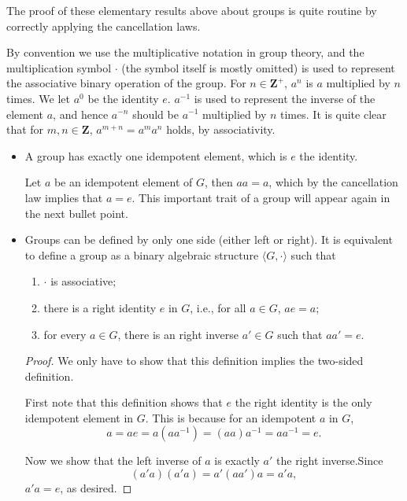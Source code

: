 \documentclass[11pt]{article}
\newcommand{\Z}{\mathbf{Z}}
\newcommand{\la}{\langle}
\newcommand{\ra}{\rangle}
\begin{document}
The proof of these elementary results above about groups is quite routine by correctly applying the cancellation laws.
\begin{framed}
    By convention we use the multiplicative notation in group theory, and the multiplication symbol $\cdot$ (the symbol itself is mostly omitted) is used to represent the associative binary operation of the group. For $n \in \Z^+$, $a^n$ is $a$ multiplied by $n$ times. We let $a^0$ be the identity $e$. $a^{-1}$ is used to represent the inverse of the element $a$, and hence $a^{-n}$ should be $a^{-1}$ multiplied by $n$ times. It is quite clear that for $m,n \in \Z$, $a^{m+n} = a^ma^n$ holds, by associativity.
\end{framed}
\begin{itemize}
    \item A group has exactly one idempotent element, which is $e$ the identity.

    Let $a$ be an idempotent element of $G$, then $aa = a$, which by the cancellation law implies that $a = e$. This important trait of a group will appear again in the next bullet point.
    \item Groups can be defined by only one side (either left or right). It is equivalent to define a group as a binary algebraic structure $\la G, \cdot \ra$ such that
    \begin{enumerate}[label=(\alph*)]
        \item $\cdot$ is associative;
        \item there is a right identity $e$ in $G$, i.e., for all $a \in G$, $ae = a$;
        \item for every $a \in G$, there is an right inverse $a' \in G$ such that $aa' = e$.
    \end{enumerate}
    \begin{proof}
        We only have to show that this definition implies the two-sided definition.

        First note that this definition shows that $e$ the right identity is the only idempotent element in $G$. This is because for an idempotent $a$ in $G$, \[a = ae = a(aa^{-1}) = (aa)a^{-1} = aa^{-1} = e.\]

        Now we show that the left inverse of $a$ is exactly $a'$ the right inverse.Since \[(a'a)(a'a) = a'(aa')a = a'a,\] $a'a = e$, as desired.


\end{proof}
\end{itemize}
\end{document}
